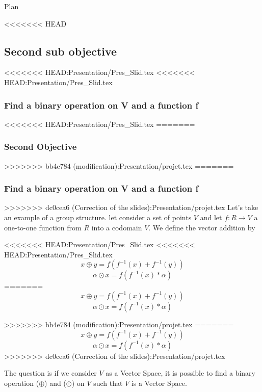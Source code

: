 \documentclass{beamer}
\begin{document}
\begin{frame}{Plan}
\begin{frame}
\begin{frame}
\begin{frame}
\begin{frame}
\begin{frame}
\begin{frame}
\begin{frame}

    
\end{frame}
<<<<<<< HEAD
\subsection{Second sub objective}
\begin{frame}
<<<<<<< HEAD:Presentation/Pres_Slid.tex
<<<<<<< HEAD:Presentation/Pres_Slid.tex
    \frametitle{Find a binary operation on V and a function f }
<<<<<<< HEAD:Presentation/Pres_Slid.tex
=======
    \frametitle{Second Objective}
>>>>>>> bb4e784 (modification):Presentation/projet.tex
=======
    \frametitle{Find a binary operation on V and a function f }
>>>>>>> dc0cea6 (Correction of the slides):Presentation/projet.tex
	Let's take an example of a group structure.
	let consider a set of points  $ V $ and let  $ f: R \rightarrow V $ a one-to-one
	function from $R$ into a codomain $V$. We define the vector addition by
	
<<<<<<< HEAD:Presentation/Pres_Slid.tex
<<<<<<< HEAD:Presentation/Pres_Slid.tex
    $$ x \oplus y = f(f^{-1}(x) + f^{-1}(y)) $$
    $$ \alpha \odot x = f(f^{-1}(x) * \alpha) $$
=======
     $$ x \oplus y = f(f^{-1}(x) + f^{-1}(y)) $$
     $$ \alpha \odot x = f(f^{-1}(x) * \alpha) $$
		
>>>>>>> bb4e784 (modification):Presentation/projet.tex
=======
    $$ x \oplus y = f(f^{-1}(x) + f^{-1}(y)) $$
    $$ \alpha \odot x = f(f^{-1}(x) * \alpha) $$
>>>>>>> dc0cea6 (Correction of the slides):Presentation/projet.tex

	The question is if we consider $V$ as a Vector Space, it is possible to find a binary operation ($\oplus$) and ($\odot$) on $V$ such that $V$ is a Vector Space.
	

\end{frame}
\end{frame}
\end{frame}
\end{frame}
\end{frame}
\end{frame}
\end{frame}
\end{frame}
\end{document}
